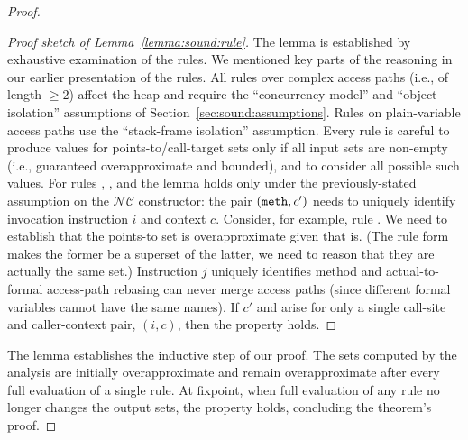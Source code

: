 \begin{theorem}
\begin{proof}
\begin{proof}[Proof sketch of Lemma~\ref{lemma:sound:rule}]
The lemma is established by exhaustive examination of the rules. We mentioned key parts of the reasoning in our earlier presentation of the rules. All rules over complex access paths (i.e., of length $\geq 2$) affect the heap and require the ``concurrency model'' and ``object isolation'' assumptions of Section~\ref{sec:sound:assumptions}. Rules on plain-variable access paths use the ``stack-frame isolation'' assumption. Every rule is careful to produce values for points-to/call-target sets only if all input sets are non-empty (i.e., guaranteed overapproximate and bounded), and to consider all possible such values.  For rules , , and  the lemma holds only under the previously-stated assumption on the $\mathcal{NC}$ constructor: the pair $(\texttt{meth}, c')$ needs to uniquely identify invocation instruction $i$ and context $c$. Consider, for example, rule . We need to establish that the points-to set  is overapproximate given that  is. (The rule form makes the former be a superset of the latter, we need to reason that they are actually the same set.) Instruction $j$ uniquely identifies method  and actual-to-formal access-path rebasing can never merge access paths (since different formal variables cannot have the same names). If $c'$ and  arise for only a single call-site and caller-context pair, $(i, c)$, then the property holds.
\end{proof}

The lemma establishes the inductive step of our proof. The sets computed by the analysis are initially overapproximate and remain overapproximate after every full evaluation of a single rule. At fixpoint, when full evaluation of any rule no longer changes the output sets, the property holds,  concluding the theorem's proof.
\end{proof}
\end{theorem}

